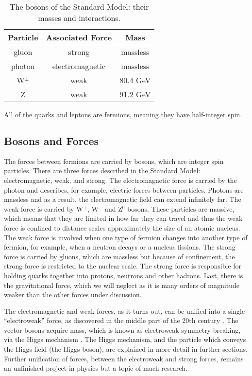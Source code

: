 \begin{table}
	\caption{The bosons of the Standard Model: their masses and interactions.  \label{tab:boson_table}}
    \center
	\begin{tabular}{| c || c | c |}
	\hline
	Particle & Associated Force & Mass \\
	\hline
	gluon & strong & massless \\
	photon & electromagnetic & massless \\
	W$^\pm$ & weak & 80.4 GeV \\
	Z & weak & 91.2 GeV \\ 
	\hline
	\end{tabular}
\end{table}


All of the quarks and leptons are fermions, meaning they have half-integer spin.

\subsection{Bosons and Forces}

The forces between fermions are carried by bosons, which are integer spin particles.  There are three forces described in the Standard Model: electromagnetic, weak, and strong.  The electromagnetic force is carried by the photon and describes, for example, electric forces between particles.  Photons are massless and as a result, the electromagnetic field can extend infinitely far.  The weak force is carried by W$^+$, W$^-$ and Z$^0$ bosons.  These particles are massive, which means that they are limited in how far they can travel and thus the weak force is confined to distance scales approximately the size of an atomic nucleus.  The weak force is involved when one type of fermion changes into another type of fermion, for example, when a neutron decays or a nucleus fissions.  The strong force is carried by gluons, which are massless but because of confinement, the strong force is restricted to the nuclear scale.  The strong force is responsible for holding quarks together into protons, neutrons and other hadrons. Last, there is the gravitational force, which we will neglect as it is many orders of magnitude weaker than the other forces under discussion.

The electromagnetic and weak forces, as it turns out, can be unified into a single ``electroweak'' force, as discovered in the middle part of the 20th century \cite{Weinberg}.  The vector bosons acquire mass, which is known as electroweak symmetry breaking, via the Higgs mechanism \cite{Higgs-1} \cite{Englert_Brout} \cite{Guralink_Hagen_Kibble}.  The Higgs mechanism, and the particle which conveys the Higgs field (the Higgs boson), are explained in more detail in further sections.  Further unification of forces, between the electroweak and strong forces, remains an unfinished project in physics but a topic of much research.  


